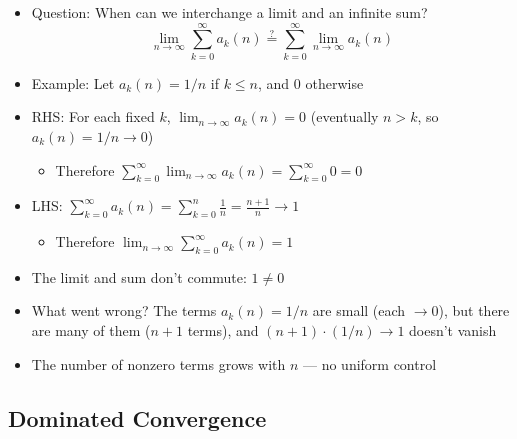 \documentclass[
  10pt,
  letterpaper,
]{scrbook}
\providecommand{\tightlist}{%
  \setlength{\itemsep}{0pt}\setlength{\parskip}{0pt}}
\begin{document}
\begin{itemize}
\tightlist
\item
  Question: When can we interchange a limit and an infinite sum?
  \[\lim_{n \to \infty} \sum_{k=0}^{\infty} a_k(n) \stackrel{?}{=} \sum_{k=0}^{\infty} \lim_{n \to \infty} a_k(n)\]
\item
  Example: Let \(a_k(n) = 1/n\) if \(k \leq n\), and \(0\) otherwise
\item
  RHS: For each fixed \(k\), \(\lim_{n \to \infty} a_k(n) = 0\)
  (eventually \(n > k\), so \(a_k(n) = 1/n \to 0\))

  \begin{itemize}
  \tightlist
  \item
    Therefore
    \(\sum_{k=0}^{\infty} \lim_{n \to \infty} a_k(n) = \sum_{k=0}^{\infty} 0 = 0\)
  \end{itemize}
\item
  LHS:
  \(\sum_{k=0}^{\infty} a_k(n) = \sum_{k=0}^{n} \frac{1}{n} = \frac{n+1}{n} \to 1\)

  \begin{itemize}
  \tightlist
  \item
    Therefore \(\lim_{n \to \infty} \sum_{k=0}^{\infty} a_k(n) = 1\)
  \end{itemize}
\item
  The limit and sum don't commute: \(1 \neq 0\)
\item
  What went wrong? The terms \(a_k(n) = 1/n\) are small (each
  \(\to 0\)), but there are many of them (\(n+1\) terms), and
  \((n+1) \cdot (1/n) \to 1\) doesn't vanish
\item
  The number of nonzero terms grows with \(n\) --- no uniform control
\end{itemize}

\subsection{Dominated Convergence}\label{dominated-convergence-1}
\end{document}
